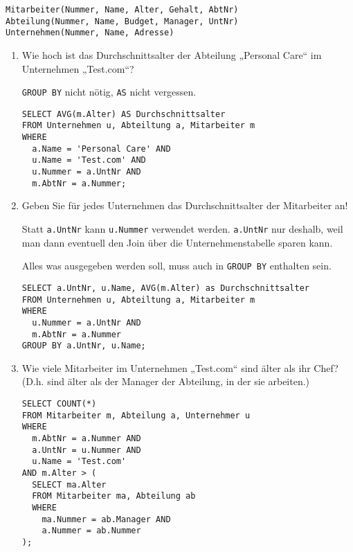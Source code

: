 \documentclass{lehramt-informatik-aufgabe}
\begin{document}
\begin{verbatim}
Mitarbeiter(Nummer, Name, Alter, Gehalt, AbtNr)
Abteilung(Nummer, Name, Budget, Manager, UntNr)
Unternehmen(Nummer, Name, Adresse)
\end{verbatim}
\begin{enumerate}

\item Wie hoch ist das Durchschnittsalter der Abteilung
„Personal Care“ im Unternehmen „Test.com“?

\begin{antwort}[muster]
\verb|GROUP BY| nicht nötig, \verb|AS| nicht vergessen.

\begin{verbatim}
SELECT AVG(m.Alter) AS Durchschnittsalter
FROM Unternehmen u, Abteiltung a, Mitarbeiter m
WHERE
  a.Name = 'Personal Care' AND
  u.Name = 'Test.com' AND
  u.Nummer = a.UntNr AND
  m.AbtNr = a.Nummer;
\end{verbatim}
\end{antwort}


\item Geben Sie für jedes Unternehmen das Durchschnittsalter
der Mitarbeiter an!

\begin{antwort}[muster]

Statt \verb|a.UntNr| kann \verb|u.Nummer| verwendet werden.
\verb|a.UntNr| nur deshalb, weil man dann eventuell den Join über die
Unternehmenstabelle sparen kann.

Alles was ausgegeben werden soll, muss auch in \verb|GROUP BY| enthalten
sein.

\begin{verbatim}
SELECT a.UntNr, u.Name, AVG(m.Alter) as Durchschnittsalter
FROM Unternehmen u, Abteiltung a, Mitarbeiter m
WHERE
  u.Nummer = a.UntNr AND
  m.AbtNr = a.Nummer
GROUP BY a.UntNr, u.Name;
\end{verbatim}
\end{antwort}


\item Wie viele Mitarbeiter im Unternehmen „Test.com“ sind
älter als ihr Chef? (D.h. sind älter als der Manager der Abteilung, in
der sie arbeiten.)

\begin{antwort}[muster]
\begin{verbatim}
SELECT COUNT(*)
FROM Mitarbeiter m, Abteilung a, Unternehmer u
WHERE
  m.AbtNr = a.Nummer AND
  a.UntNr = u.Nummer AND
  u.Name = 'Test.com'
AND m.Alter > (
  SELECT ma.Alter
  FROM Mitarbeiter ma, Abteilung ab
  WHERE
    ma.Nummer = ab.Manager AND
    a.Nummer = ab.Nummer
);
\end{verbatim}


\end{antwort}
\end{enumerate}
\end{document}
